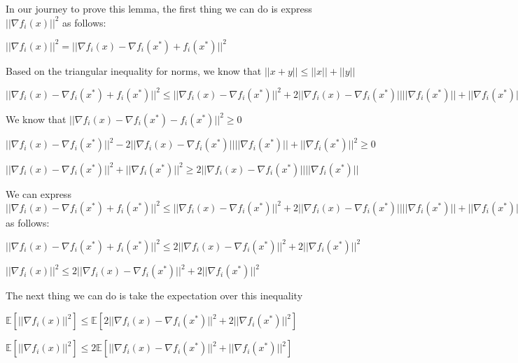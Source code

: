 In our journey to prove this lemma, the first thing we can do is express $||\nabla f_i(x)||^2$ as follows: \newline 

$||\nabla f_i(x)||^2 = ||\nabla f_i(x) - \nabla f_i(x^*) + f_i(x^*)||^2$ \newline 

Based on the triangular inequality for norms, we know that $||x + y|| \leq ||x|| + ||y||$ \newline 

$||\nabla f_i(x) - \nabla f_i(x^*) + f_i(x^*)||^2 \leq ||\nabla f_i(x) - \nabla f_i(x^*)||^2 + 2 ||\nabla f_i(x) - \nabla f_i(x^*)|| ||\nabla f_i(x^*)|| + ||\nabla f_i(x^*)||^2$ \newline 

We know that $||\nabla f_i(x) - \nabla f_i(x^*) - f_i(x^*)||^2 \geq 0$ \newline 

$||\nabla f_i(x) - \nabla f_i(x^*)||^2 - 2 ||\nabla f_i(x) - \nabla f_i(x^*)|| ||\nabla f_i(x^*)|| + ||\nabla f_i(x^*)||^2 \geq 0$ \newline 

$||\nabla f_i(x) - \nabla f_i(x^*)||^2  + ||\nabla f_i(x^*)||^2 \geq 2 ||\nabla f_i(x) - \nabla f_i(x^*)|| ||\nabla f_i(x^*)||$ \newline 

We can express $||\nabla f_i(x) - \nabla f_i(x^*) + f_i(x^*)||^2 \leq ||\nabla f_i(x) - \nabla f_i(x^*)||^2 + 2 ||\nabla f_i(x) - \nabla f_i(x^*)|| ||\nabla f_i(x^*)|| + ||\nabla f_i(x^*)||^2$  as follows: \newline 

$||\nabla f_i(x) - \nabla f_i(x^*) + f_i(x^*)||^2 \leq 2||\nabla f_i(x) - \nabla f_i(x^*)||^2 + 2||\nabla f_i(x^*)||^2$ \newline 

$||\nabla f_i(x)||^2 \leq 2||\nabla f_i(x) - \nabla f_i(x^*)||^2 + 2||\nabla f_i(x^*)||^2$ \newline 

The next thing we can do is take the expectation over this inequality \newline

\noindent $\mathbb{E}[||\nabla f_i(x)||^2] \leq \mathbb{E} [2||\nabla f_i(x) - \nabla f_i(x^*)||^2 + 2||\nabla f_i(x^*)||^2]$ \newline 

$\mathbb{E}[||\nabla f_i(x)||^2] \leq 2\mathbb{E} [||\nabla f_i(x) - \nabla f_i(x^*)||^2 + ||\nabla f_i(x^*)||^2]$ \newline 

